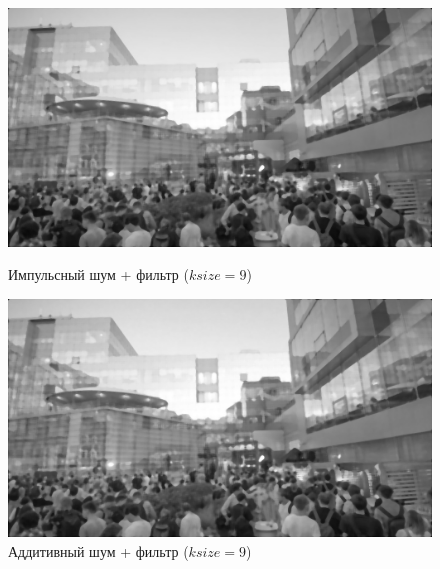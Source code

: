\documentclass[a4paper]{article}
\begin{document}
\begin{figure}[H]
    \begin{minipage}{0.49\textwidth}
        \centering \includegraphics[width=\textwidth]{images/3_nonlinear_filters/impulse - 2d-median (ksize=9).jpg}
        \caption{Импульсный шум + фильтр ($ksize = 9$)}
    \end{minipage}\hfill
    \begin{minipage}{0.49\textwidth}
        \centering \includegraphics[width=\textwidth]{images/3_nonlinear_filters/additive - 2d-median (ksize=9).jpg}
        \caption{Аддитивный шум + фильтр ($ksize = 9$)}
    \end{minipage}
\end{figure}
\end{document}
